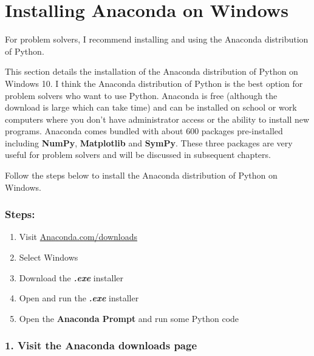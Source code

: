 \documentclass{book}
\begin{document}
    
        \section{Installing Anaconda on
Windows}\label{installing-anaconda-on-windows}
    




    
        For problem solvers, I recommend installing and using the Anaconda
distribution of Python.
    




    
        This section details the installation of the Anaconda distribution of
Python on Windows 10. I think the Anaconda distribution of Python is the
best option for problem solvers who want to use Python. Anaconda is free
(although the download is large which can take time) and can be
installed on school or work computers where you don't have administrator
access or the ability to install new programs. Anaconda comes bundled
with about 600 packages pre-installed including \textbf{NumPy},
\textbf{Matplotlib} and \textbf{SymPy}. These three packages are very
useful for problem solvers and will be discussed in subsequent chapters.

Follow the steps below to install the Anaconda distribution of Python on
Windows.

\subsubsection{Steps:}\label{steps}

\begin{enumerate}
\def\labelenumi{\arabic{enumi}.}
\item
  Visit
  \href{https://www.anaconda.com/download/}{Anaconda.com/downloads}
\item
  Select Windows
\item
  Download the \textbf{\emph{.exe}} installer
\item
  Open and run the \textbf{\emph{.exe}} installer
\item
  Open the \textbf{Anaconda Prompt} and run some Python code
\end{enumerate}
    




    
        \subsubsection{1. Visit the Anaconda downloads
page}\label{visit-the-anaconda-downloads-page}
\end{document}
